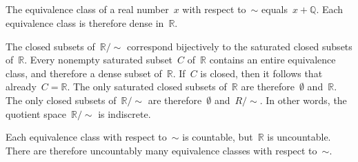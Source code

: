 \subsection{}

The equivalence class of a real number~$x$ with respect to~$∼$ equals~$x + ℚ$.
Each equivalence class is therefore dense in~$ℝ$.

The closed subsets of~$ℝ / {∼}$ correspond bijectively to the saturated closed subsets of~$ℝ$.
Every nonempty saturated subset~$C$ of~$ℝ$ contains an entire equivalence class, and therefore a dense subset of~$ℝ$.
If~$C$ is closed, then it follows that already~$C = ℝ$.
The only saturated closed subsets of~$ℝ$ are therefore~$∅$ and~$ℝ$.
The only closed subsets of~$ℝ / {∼}$ are therefore~$∅$ and~$R / {∼}$.
In other words, the quotient space~$ℝ / {∼}$ is indiscrete.

Each equivalence class with respect to~$∼$ is countable, but~$ℝ$ is uncountable.
There are therefore uncountably many equivalence classes with respect to~$∼$.

